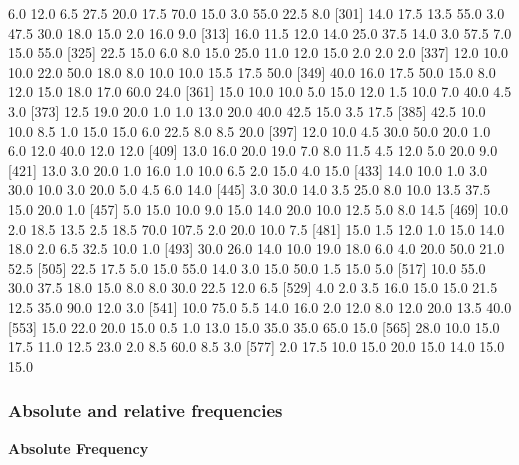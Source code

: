 \documentclass[a4paper]{article}
\begin{document}
\begin{Schunk}
\begin{Soutput}
[289]   6.0  12.0   6.5  27.5  20.0  17.5  70.0  15.0   3.0  55.0  22.5   8.0
[301]  14.0  17.5  13.5  55.0   3.0  47.5  30.0  18.0  15.0   2.0  16.0   9.0
[313]  16.0  11.5  12.0  14.0  25.0  37.5  14.0   3.0  57.5   7.0  15.0  55.0
[325]  22.5  15.0   6.0   8.0  15.0  25.0  11.0  12.0  15.0   2.0   2.0   2.0
[337]  12.0  10.0  10.0  22.0  50.0  18.0   8.0  10.0  10.0  15.5  17.5  50.0
[349]  40.0  16.0  17.5  50.0  15.0   8.0  12.0  15.0  18.0  17.0  60.0  24.0
[361]  15.0  10.0  10.0   5.0  15.0  12.0   1.5  10.0   7.0  40.0   4.5   3.0
[373]  12.5  19.0  20.0   1.0   1.0  13.0  20.0  40.0  42.5  15.0   3.5  17.5
[385]  42.5  10.0  10.0   8.5   1.0  15.0  15.0   6.0  22.5   8.0   8.5  20.0
[397]  12.0  10.0   4.5  30.0  50.0  20.0   1.0   6.0  12.0  40.0  12.0  12.0
[409]  13.0  16.0  20.0  19.0   7.0   8.0  11.5   4.5  12.0   5.0  20.0   9.0
[421]  13.0   3.0  20.0   1.0  16.0   1.0  10.0   6.5   2.0  15.0   4.0  15.0
[433]  14.0  10.0   1.0   3.0  30.0  10.0   3.0  20.0   5.0   4.5   6.0  14.0
[445]   3.0  30.0  14.0   3.5  25.0   8.0  10.0  13.5  37.5  15.0  20.0   1.0
[457]   5.0  15.0  10.0   9.0  15.0  14.0  20.0  10.0  12.5   5.0   8.0  14.5
[469]  10.0   2.0  18.5  13.5   2.5  18.5  70.0 107.5   2.0  20.0  10.0   7.5
[481]  15.0   1.5  12.0   1.0  15.0  14.0  18.0   2.0   6.5  32.5  10.0   1.0
[493]  30.0  26.0  14.0  10.0  19.0  18.0   6.0   4.0  20.0  50.0  21.0  52.5
[505]  22.5  17.5   5.0  15.0  55.0  14.0   3.0  15.0  50.0   1.5  15.0   5.0
[517]  10.0  55.0  30.0  37.5  18.0  15.0   8.0   8.0  30.0  22.5  12.0   6.5
[529]   4.0   2.0   3.5  16.0  15.0  15.0  21.5  12.5  35.0  90.0  12.0   3.0
[541]  10.0  75.0   5.5  14.0  16.0   2.0  12.0   8.0  12.0  20.0  13.5  40.0
[553]  15.0  22.0  20.0  15.0   0.5   1.0  13.0  15.0  35.0  35.0  65.0  15.0
[565]  28.0  10.0  15.0  17.5  11.0  12.5  23.0   2.0   8.5  60.0   8.5   3.0
[577]   2.0  17.5  10.0  15.0  20.0  15.0  14.0  15.0  15.0
\end{Soutput}
\end{Schunk}


\subsubsection*{Absolute and relative frequencies}


\textbf{Absolute Frequency}
\end{document}
